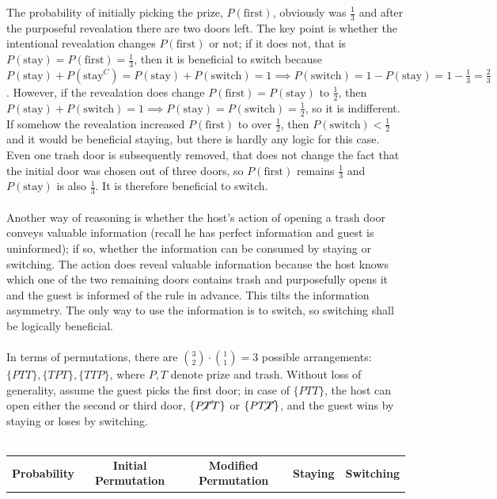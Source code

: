 \documentclass[12pt]{article}
\begin{document}
\begin{enumerate}
The probability of initially picking the prize, $P(\text{first})$, obviously was $\frac{1}{3}$ and after the purposeful revealation there are two doors left.
The key point is whether the intentional revealation changes $P(\text{first})$ or not; if it does not, that is $P(\text{stay}) = P(\text{first}) = \frac{1}{3}$, then it is beneficial to switch because $P(\text{stay}) + P(\text{stay}^C) = P(\text{stay}) + P(\text{switch}) = 1 \implies P(\text{switch}) = 1 - P(\text{stay}) = 1 - \frac{1}{3} = \frac{2}{3}$.
However, if the revealation does change $ P(\text{first}) = P(\text{stay}) $ to $\frac{1}{2}$, then $ P(\text{stay}) + P(\text{switch}) = 1 \implies P(\text{stay}) = P(\text{switch}) = \frac{1}{2}$, so it is indifferent. If somehow the revealation increased $P(\text{first})$ to over $\frac{1}{2}$, then $P(\text{switch}) < \frac{1}{2}$ and it would be beneficial staying, but there is hardly any logic for this case.
Even one trash door is subsequently removed, that does not change the fact that the initial door was chosen out of three doors, so $P(\text{first})$ remains $\frac{1}{3}$ and $P(\text{stay})$ is also $\frac{1}{3}$. It is therefore beneficial to switch. 
\\\\
Another way of reasoning is whether the host's action of opening a trash door conveys valuable information (recall he has perfect information and guest is uninformed); if so, whether the information can be consumed by staying or switching. 
The action does reveal valuable information because the host knows which one of the two remaining doors contains trash and purposefully opens it and the guest is informed of the rule in advance. This tilts the information asymmetry. The only way to use the information is to switch, so switching shall be logically beneficial.   
\\\\
In terms of permutations, there are $\binom{3}{2} \cdot \binom{1}{1} = 3$ possible arrangements: $\{PTT\}, \{TPT\}, \{TTP\}$, where $P, T$ denote prize and trash.
Without loss of generality, assume the guest picks the first door; in case of $\{PTT\}$, the host can open either the second or third door, $\{P\cancel{T}T\}$ or $\{PT\cancel{T}\}$, and the guest wins by staying or loses by switching. 
\\\\
\begin{tabular}{ | c | c | c | c | c | }
\hline 
\textbf{Probability} & \textbf{Initial Permutation} & \textbf{Modified Permutation} & \textbf{Staying} & \textbf{Switching} \\

\end{tabular}
\end{enumerate}
\end{document}
